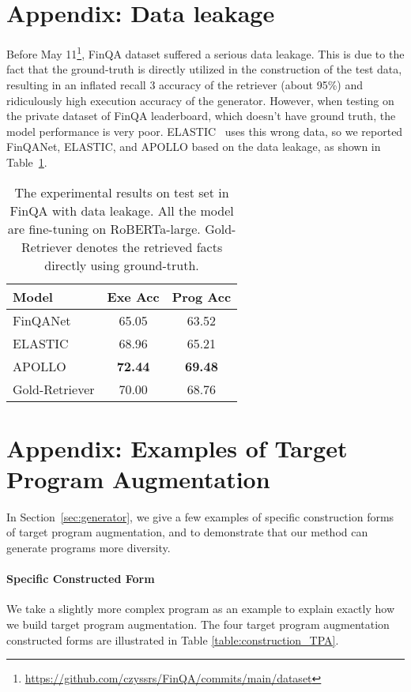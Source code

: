 \documentclass[11pt]{article}
\begin{document}
\section{Appendix: Data leakage}
\label{appendix:data_leakage}
Before May 11\footnote{\url{https://github.com/czyssrs/FinQA/commits/main/dataset}}, FinQA dataset suffered a serious data leakage. This is due to the fact that the ground-truth is directly utilized in the construction of the test data, resulting in an inflated recall 3 accuracy of the retriever (about 95\%) and ridiculously high execution accuracy of the generator. However, when testing on the private dataset of FinQA leaderboard, which doesn't have ground truth, the model performance is very poor. ELASTIC~\cite{zhang2022elastic} uses this wrong data, so we reported FinQANet, ELASTIC, and APOLLO based on the data leakage, as shown in Table~\ref{table:data_leakage}.

\begin{table}[h]
\centering
\begin{tabular}{l|c|c}
\hline
Model          & Exe Acc & Prog Acc \\ \hline
FinQANet       & 65.05   & 63.52    \\
ELASTIC        & 68.96   & 65.21    \\
APOLLO           & \textbf{72.44}   & \textbf{69.48}    \\ \hline
Gold-Retriever & 70.00   & 68.76    \\ \hline
\end{tabular}
\caption{The experimental results on test set in FinQA with data leakage. All the model are fine-tuning on RoBERTa-large. Gold-Retriever denotes the retrieved facts directly using ground-truth.}
\label{table:data_leakage}
\end{table}

\section{Appendix: Examples of Target Program Augmentation}
\label{appendix:example_TPA}
In Section~\ref{sec:generator}, we give a few examples of specific construction forms of target program augmentation, and to demonstrate that our method can generate programs more diversity.

\paragraph{Specific Constructed Form} 
We take a slightly more complex program as an example to explain exactly how we build target program augmentation. The four target program augmentation constructed forms are illustrated in Table \ref{table:construction_TPA}.
\end{document}
